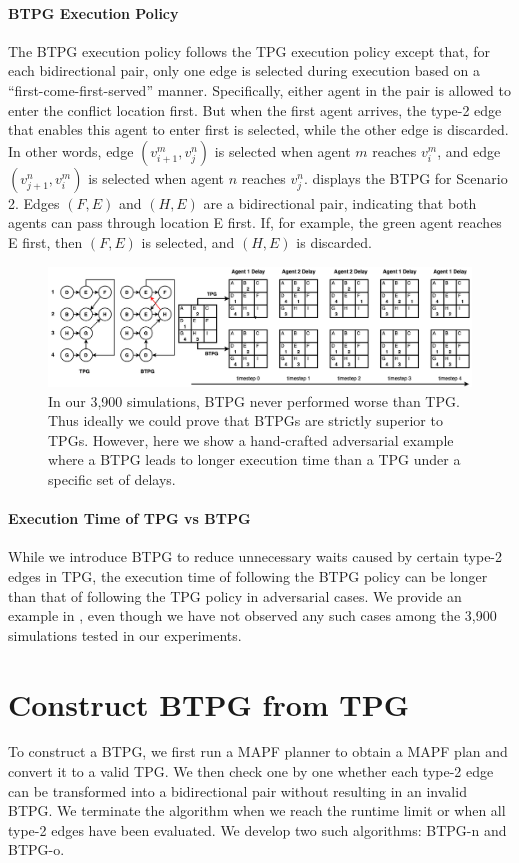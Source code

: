\documentclass[letterpaper]{article}
\theoremstyle{definition}
\begin{document}
\paragraph{BTPG Execution Policy}
The BTPG execution policy follows the TPG execution policy except that, for each bidirectional pair, only one edge is selected during execution based on a ``first-come-first-served'' manner. Specifically, either agent in the pair is allowed to enter the conflict location first. But when the first agent arrives, the type-2 edge that enables this agent to enter first is selected, while the other edge is discarded. In other words, edge $(v_{i+1}^m, v_j^n)$ is selected when agent $m$ reaches $v_i^m$, and edge $(v_{j+1}^n, v_{i}^m)$ is selected when agent $n$ reaches $v_j^n$.
 displays the BTPG for Scenario 2.
Edges $(F,E)$ and $(H,E)$ are a bidirectional pair, indicating that both agents can pass through location E first. If, for example, the green agent reaches E first, then $(F,E)$ is selected, and $(H,E)$ is discarded.

\begin{figure}[h]
\centering
\includegraphics[width=\textwidth]{Figs/BTPGWorseEx.png}
\caption{In our 3,900 simulations, BTPG never performed worse than TPG.
Thus ideally we could prove that BTPGs are strictly superior to TPGs.
However, here we show a hand-crafted adversarial example where a BTPG leads to longer execution time than a TPG under a specific set of delays.
}
\label{fig:counter-ex}
\end{figure}
\paragraph{Execution Time of TPG vs BTPG} While we introduce BTPG to reduce unnecessary waits caused by certain type-2 edges in TPG, the execution time of following the BTPG policy can be longer than that of following the TPG policy in adversarial cases. We provide an example in , even though we have not observed any such cases among the 3,900 simulations tested in our experiments.


\section{Construct BTPG from TPG}
To construct a BTPG, we first run a MAPF planner to obtain a MAPF plan and convert it to a valid TPG. We then check one by one whether each type-2 edge can be transformed into a bidirectional pair without resulting in an invalid BTPG. We terminate the algorithm when we reach the runtime limit or when all type-2 edges have been evaluated. We develop two such algorithms: BTPG-n and BTPG-o.
\end{document}
